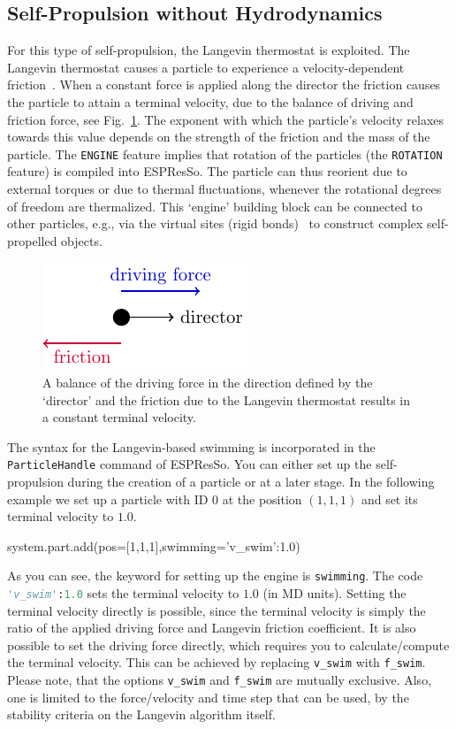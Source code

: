 \documentclass[aip,jcp,reprint,a4paper,onecolumn,amsmath]{revtex4-1}
\newcommand\code{\lstinline}
\newcommand{\es}{\mbox{\textsf{ESPResSo}}\xspace}
\newcommand\codees{\lstinline[language=python]}
\begin{document}
\subsection{\label{sub:langevin}Self-Propulsion without Hydrodynamics}

For this type of self-propulsion, the Langevin thermostat is exploited. The Langevin thermostat causes a particle to experience a velocity-dependent friction~\cite{UG}. When a constant force is applied along the director the friction causes the particle to attain a terminal velocity, due to the balance of driving and friction force, see Fig.~\ref{fig:balance}. The exponent with which the particle's velocity relaxes towards this value depends on the strength of the friction and the mass of the particle. The \code{ENGINE} feature implies that rotation of the particles (the \code{ROTATION} feature) is compiled into \es{}. The particle can thus reorient due to external torques or due to thermal fluctuations, whenever the rotational degrees of freedom are thermalized. This `engine' building block can be connected to other particles, e.g., via the virtual sites (rigid bonds)~\cite{UG} to construct complex self-propelled objects.

\begin{figure}[!htb]
\begin{center}
\includegraphics[scale=1.0]{FIGURES/friction}
\end{center}
\caption{\label{fig:balance}A balance of the driving force in the direction defined by the `director' and the friction due to the Langevin thermostat results in a constant terminal velocity.}
\end{figure}

The syntax for the Langevin-based swimming is incorporated in the \codees{ParticleHandle} command of \es{}. You can either set up the self-propulsion during the creation of a particle or at a later stage. In the following example we set up a particle with ID 0 at the position $(1,1,1)$ and set its terminal velocity to $1.0$.
\begin{espresso}
system.part.add(pos=[1,1,1],swimming={'v_swim':1.0})
\end{espresso}
As you can see, the keyword for setting up the engine is \codees{swimming}. The code \codees{'v_swim':1.0} sets the terminal velocity to $1.0$ (in MD units). Setting the terminal velocity directly is possible, since the terminal velocity is simply the ratio of the applied driving force and Langevin friction coefficient. It is also possible to set the driving force directly, which requires you to calculate/compute the terminal velocity. This can be achieved by replacing \codees{v_swim} with \codees{f_swim}. Please note, that the options \codees{v_swim} and \codees{f_swim} are mutually exclusive. Also, one is limited to the force/velocity and time step that can be used, by the stability criteria on the Langevin algorithm itself.
\end{document}
